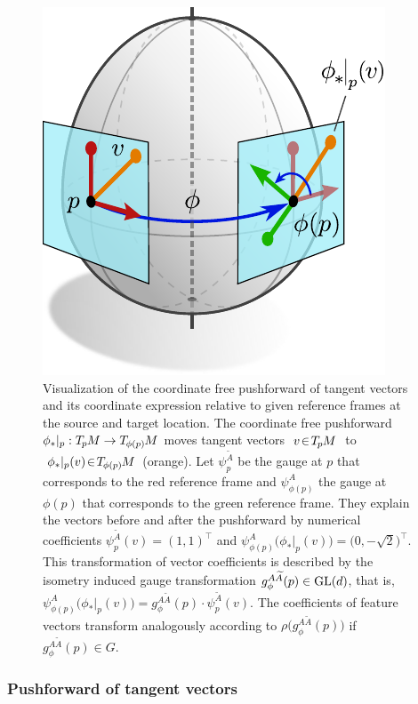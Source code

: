 \begin{figure}
    \centering
    \hspace{.5ex}
    \includegraphics[width=.35\textwidth]{figures/isometry_egg_tangent_vector_gauge_trafo.pdf}
    \caption[]{\small
        Visualization of the coordinate free pushforward of tangent vectors and its coordinate expression relative to given reference frames at the source and target location.
        The coordinate free pushforward ${\phi_*|_p: T_{\mkern-1.5mu p}\mkern-.5muM \to T_{\mkern-1.5mu \phi(p)}\mkern-1muM}$ moves tangent vectors $\ v \!\in\! T_{\mkern-1.5mu p}\mkern-.5muM\ $ to $\ \phi_*|_p(v) \!\in\! T_{\mkern-1.5mu \phi(p)}\mkern-1muM\,$ (orange).
        Let $\psi_p^{\widetilde{A}}$ be the gauge at $p$ that corresponds to the red reference frame and $\psi_{\phi(p)}^A$ the gauge at $\phi(p)$ that corresponds to the green reference frame.
        They explain the vectors before and after the pushforward by numerical coefficients $\psi_p^{\widetilde{A}}(v) = (1,1)^\top$ and $\psi_{\phi(p)}^A \big( \phi_*|_p(v) \big) = \big(0,-\sqrt{2}\big)^\top$.
        This transformation of vector coefficients is described by the isometry induced gauge transformation $g_\phi^{A\widetilde{A}}(p) \in \operatorname{GL}(d)$, that is,
        $\psi_{\phi(p)}^A \big( \phi_*|_p(v) \big) = g_\phi^{A\widetilde{A}}(p) \cdot \psi_p^{\widetilde{A}}(v)$.
        The coefficients of feature vectors transform analogously according to $\rho\big( g_\phi^{A\widetilde{A}}(p) \big)$ if $g_\phi^{A\widetilde{A}}(p) \in G$.
        \\[1ex]
        }
    \label{fig:pushforward_vector_components}
\end{figure}





\subsubsection{Pushforward of tangent vectors}


